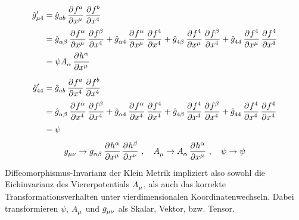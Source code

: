 \begin{equation}
\begin{split}
\tensor*{\hat{g}}{*^\prime_\mu_4}&=\tensor{\hat{g}}{_a_b}\dpd{f^a}{\tensor{x}{^\mu}}\dpd{f^b}{\tensor{x}{^4}}\\
&=\tensor{\hat{g}}{_\alpha_\beta}\dpd{f^\alpha}{\tensor{x}{^\mu}}\dpd{f^\beta}{\tensor{x}{^4}}
+\tensor{\hat{g}}{_\alpha_4}\dpd{f^\alpha}{\tensor{x}{^\mu}}\dpd{f^4}{\tensor{x}{^4}}
+\tensor{\hat{g}}{_4_\beta}\dpd{f^4}{\tensor{x}{^\mu}}\dpd{f^\beta}{\tensor{x}{^4}}
+\tensor{\hat{g}}{_4_4}\dpd{f^4}{\tensor{x}{^\mu}}\dpd{f^4}{\tensor{x}{^4}}\\
&=\psi\tensor{A}{_\alpha}\dpd{h^\alpha}{\tensor{x}{^\mu}}
\end{split}
\end{equation}
\begin{equation}
\begin{split}
\tensor*{\hat{g}}{*^\prime_4_4}&=\tensor{\hat{g}}{_a_b}\dpd{f^a}{\tensor{x}{^4}}\dpd{f^b}{\tensor{x}{^4}}\\
&=\tensor{\hat{g}}{_\alpha_\beta}\dpd{f^\alpha}{\tensor{x}{^4}}\dpd{f^\beta}{\tensor{x}{^4}}
+\tensor{\hat{g}}{_\alpha_4}\dpd{f^\alpha}{\tensor{x}{^4}}\dpd{f^4}{\tensor{x}{^4}}
+\tensor{\hat{g}}{_4_\beta}\dpd{f^4}{\tensor{x}{^4}}\dpd{f^\beta}{\tensor{x}{^4}}
+\tensor{\hat{g}}{_4_4}\dpd{f^4}{\tensor{x}{^4}}\dpd{f^4}{\tensor{x}{^4}}\\
&=\psi
\end{split}
\end{equation}
\begin{equation}
\tensor{g}{_\mu_\nu}\to\tensor{g}{_\alpha_\beta}\dpd{h^\alpha}{\tensor{x}{^\mu}}\dpd{h^\beta}{\tensor{x}{^\nu}}\,,\quad
\tensor{A}{_\mu}\to\tensor{A}{_\alpha}\dpd{h^\alpha}{\tensor{x}{^\mu}}\,,\quad
\psi\to\psi
\end{equation}
Diffeomorphismus-Invarianz der Klein Metrik impliziert also sowohl die
Eichinvarianz des Viererpotentials $\tensor{A}{_\mu}$, als auch das korrekte
Transformationsverhalten unter vierdimensionalen Koordinatenwechseln.
Dabei transformieren $\psi$, $\tensor{A}{_\mu}$ und $\tensor{g}{_\mu_\nu}$ als
Skalar, Vektor, bzw. Tensor.

